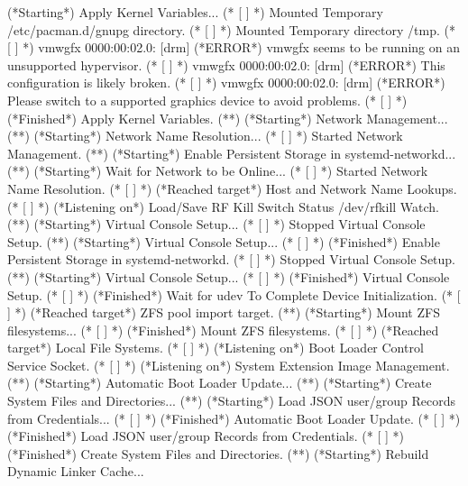 \documentclass{article}
\newcommand{\gbox}[1]{%
\textcolor{terminalgray}{[}%
\makebox[2.5em] [c]{\textcolor{terminalgreen}{#1}}%
\textcolor{terminalgray}{]}%
}
\newcommand{\rbox}[1]{%
\textcolor{terminalgray}{[}%
\makebox[8.5em][c]{\textcolor{terminalred}{#1}}%
\textcolor{terminalgray}{]}%
}
\newcommand{\graytext}[1]{\textcolor{terminalgray}{#1}}
\newcommand{\errtext}[1]{\textcolor{terminalred}{#1}}
\newcommand{\spc}{\hspace{3.7em}}
\begin{document}
\begin{linuxterminal}
(*\graytext{Starting}*) Apply Kernel Variables...
(*\gbox{OK}*) Mounted Temporary /etc/pacman.d/gnupg directory.
(*\gbox{OK}*) Mounted Temporary directory /tmp.
(*\rbox{20.480467}*) vmwgfx 0000:00:02.0: [drm] (*\errtext{\string*ERROR\string*}*) vmwgfx seems to be running on an unsupported hypervisor.
(*\rbox{20.480475}*) vmwgfx 0000:00:02.0: [drm] (*\errtext{\string*ERROR\string*}*) This configuration is likely broken.
(*\rbox{20.480478}*) vmwgfx 0000:00:02.0: [drm] (*\errtext{\string*ERROR\string*}*) Please switch to a supported graphics device to avoid problems.
(*\gbox{OK}*) (*\graytext{Finished}*) Apply Kernel Variables.
(*\spc*) (*\graytext{Starting}*) Network Management...
(*\spc*) (*\graytext{Starting}*) Network Name Resolution...
(*\gbox{OK}*) Started Network Management.
(*\spc*) (*\graytext{Starting}*) Enable Persistent Storage in systemd-networkd...
(*\spc*) (*\graytext{Starting}*) Wait for Network to be Online...
(*\gbox{OK}*) Started Network Name Resolution.
(*\gbox{OK}*) (*\graytext{Reached target}*) Host and Network Name Lookups.
(*\gbox{OK}*) (*\graytext{Listening on}*) Load/Save RF Kill Switch Status /dev/rfkill Watch.
(*\spc*) (*\graytext{Starting}*) Virtual Console Setup...
(*\gbox{OK}*) Stopped Virtual Console Setup.
(*\spc*) (*\graytext{Starting}*) Virtual Console Setup...
(*\gbox{OK}*) (*\graytext{Finished}*) Enable Persistent Storage in systemd-networkd.
(*\gbox{OK}*) Stopped Virtual Console Setup.
(*\spc*) (*\graytext{Starting}*) Virtual Console Setup...
(*\gbox{OK}*) (*\graytext{Finished}*) Virtual Console Setup.
(*\gbox{OK}*) (*\graytext{Finished}*) Wait for udev To Complete Device Initialization.
(*\gbox{OK}*) (*\graytext{Reached target}*) ZFS pool import target.
(*\spc*) (*\graytext{Starting}*) Mount ZFS filesystems...
(*\gbox{OK}*) (*\graytext{Finished}*) Mount ZFS filesystems.
(*\gbox{OK}*) (*\graytext{Reached target}*) Local File Systems.
(*\gbox{OK}*) (*\graytext{Listening on}*) Boot Loader Control Service Socket.
(*\gbox{OK}*) (*\graytext{Listening on}*) System Extension Image Management.
(*\spc*) (*\graytext{Starting}*) Automatic Boot Loader Update...
(*\spc*) (*\graytext{Starting}*) Create System Files and Directories...
(*\spc*) (*\graytext{Starting}*) Load JSON user/group Records from Credentials...
(*\gbox{OK}*) (*\graytext{Finished}*) Automatic Boot Loader Update.
(*\gbox{OK}*) (*\graytext{Finished}*) Load JSON user/group Records from Credentials.
(*\gbox{OK}*) (*\graytext{Finished}*) Create System Files and Directories.
(*\spc*) (*\graytext{Starting}*) Rebuild Dynamic Linker Cache...

\end{linuxterminal}
\end{document}
